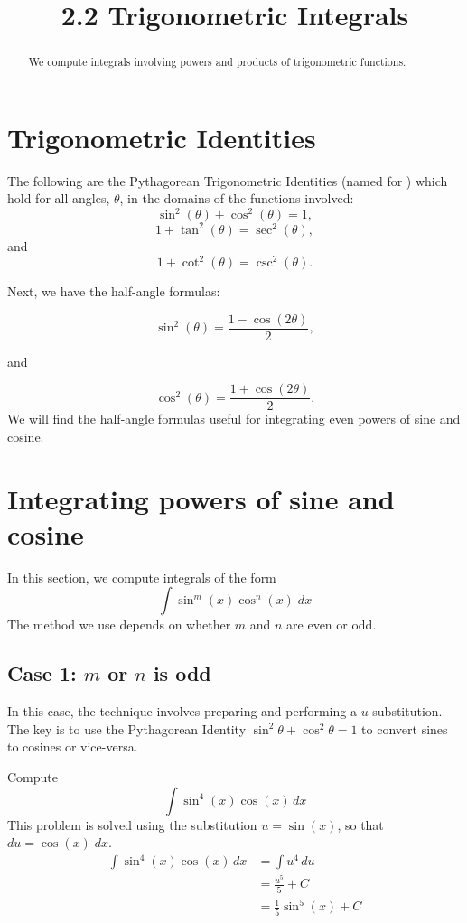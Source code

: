 \documentclass{ximera}
\title{2.2 Trigonometric Integrals}
\begin{document}
\begin{abstract}
We compute integrals involving powers and products of trigonometric functions.
\end{abstract}

\maketitle

\section{Trigonometric Identities}

The following are the Pythagorean Trigonometric Identities 
(named for ) which hold for all angles,
$\theta$, in the domains of the functions involved:
\[
\sin^2(\theta) + \cos^2(\theta) = 1,
\]
\[
1 + \tan^2(\theta) = \sec^2(\theta),
\]
and
\[
1 + \cot^2(\theta) = \csc^2(\theta).
\]


Next, we have the half-angle formulas:

\[
\sin^2(\theta) = \frac{1-\cos(2\theta)}{2},
\]

and

\[
\cos^2(\theta) = \frac{1+\cos(2\theta)}{2}.
\]
We will find the half-angle formulas useful for integrating even powers of sine and cosine.

\section{Integrating powers of sine and cosine}

In this section, we compute integrals of the form
\[
\int \sin^m(x) \cos^n(x) \; dx
\]
The method we use depends on whether $m$ and $n$ are even or odd.

\subsection{Case 1: $m$ or $n$ is odd}
In this case, the technique involves preparing and performing a $u$-substitution. The key is to use the Pythagorean 
Identity $\sin^2 \theta + \cos^2 \theta = 1$ to convert
sines to cosines or vice-versa.

\begin{example}[example 1]
Compute
\[
\int \sin^4(x) \cos(x) \, dx
\]
This problem is solved using the substitution $u = \sin(x)$, so that $du = \cos(x) \; dx$.
\begin{align*}
\int \sin^4(x) \cos(x) \, dx &= \int u^4 \, du\\
                             &= \frac{u^5}{5} + C\\
                             &= \frac15 \sin^5(x) + C
\end{align*}

\end{example}
\end{document}
